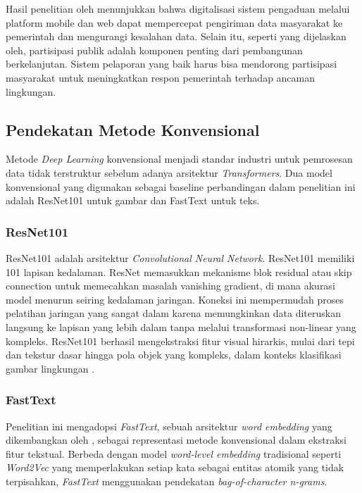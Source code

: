 Hasil penelitian oleh \citep{firgiaImplementasiSistemInformasi2022} menunjukkan bahwa digitalisasi sistem pengaduan melalui platform mobile dan web dapat mempercepat pengiriman data masyarakat ke pemerintah dan mengurangi kesalahan data. Selain itu, seperti yang dijelaskan oleh, partisipasi publik adalah komponen penting dari pembangunan berkelanjutan. Sistem pelaporan yang baik harus bisa mendorong partisipasi masyarakat untuk meningkatkan respon pemerintah terhadap ancaman lingkungan.

\subsection{Pendekatan Metode Konvensional}
Metode \textit {Deep Learning} konvensional menjadi standar industri untuk pemrosesan data tidak terstruktur sebelum adanya arsitektur \textit{Transformers}. Dua model konvensional yang digunakan sebagai baseline perbandingan dalam penelitian ini adalah ResNet101 untuk gambar dan FastText untuk teks. 
\subsubsection{ResNet101}
ResNet101 adalah arsitektur \textit{Convolutional Neural Network}. ResNet101 memiliki 101 lapisan kedalaman. ResNet memasukkan mekanisme blok residual atau skip connection untuk memecahkan masalah vanishing gradient, di mana akurasi model menurun seiring kedalaman jaringan. Koneksi ini mempermudah proses pelatihan jaringan yang sangat dalam karena memungkinkan data diteruskan langsung ke lapisan yang lebih dalam tanpa melalui transformasi non-linear yang kompleks. ResNet101 berhasil mengekstraksi fitur visual hirarkis, mulai dari tepi dan tekstur dasar hingga pola objek yang kompleks, dalam konteks klasifikasi gambar lingkungan \citep{heDeepResidualLearning2015}.
\subsubsection{FastText}

Penelitian ini mengadopsi \textit{FastText}, sebuah arsitektur \textit{word embedding} yang dikembangkan oleh \citep{joulinBagTricksEfficient2017}, sebagai representasi metode konvensional dalam ekstraksi fitur tekstual. Berbeda dengan model \textit{word-level embedding} tradisional seperti \textit{Word2Vec} yang memperlakukan setiap kata sebagai entitas atomik yang tidak terpisahkan, \textit{FastText} menggunakan pendekatan \textit{bag-of-character n-grams}. 

